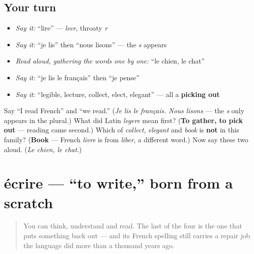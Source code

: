 \subsection*{Your turn}
\begin{itemize}
\raggedright
  \item \emph{Say it:} \textquotedblleft{}lire\textquotedblright{} — \emph{leer}, throaty \emph{r}
  \item \emph{Say it:} \textquotedblleft{}je lis\textquotedblright{} then \textquotedblleft{}nous lisons\textquotedblright{} — the \emph{s} appears
  \item \emph{Read aloud, gathering the words one by one:} \textquotedblleft{}le chien, le chat\textquotedblright{}
  \item \emph{Say it:} \textquotedblleft{}je lis le français\textquotedblright{} then \textquotedblleft{}je pense\textquotedblright{}
  \item \emph{Say it:} \textquotedblleft{}legible, lecture, collect, elect, elegant\textquotedblright{} — all a \textbf{picking out}
\end{itemize}

\begin{tcolorbox}[breakable,colback=teal!4,colframe=teal!35!black,title={Before you move on}]
Say \textquotedblleft{}I read French\textquotedblright{} and \textquotedblleft{}we read.\textquotedblright{} (\emph{Je lis le français. Nous lisons} — the \emph{s} only appears in the plural.) What did Latin \emph{legere} mean first? (\textbf{To gather, to pick out} — reading came second.) Which of \emph{collect}, \emph{elegant} and \emph{book} is \textbf{not} in this family? (\textbf{Book} — French \emph{livre} is from \emph{liber}, a different word.) Now say these two aloud. (\emph{Le chien, le chat}.)
\end{tcolorbox}
\section[écrire]{écrire — \textquotedblleft{}to write,\textquotedblright{} born from a scratch}

\label{lesson:FR-C25-ecrire}



\begin{quote}
You can think, understand and read. The last of the four is the one that puts something back out — and its French spelling still carries a repair job the language did more than a thousand years ago.
\end{quote}

